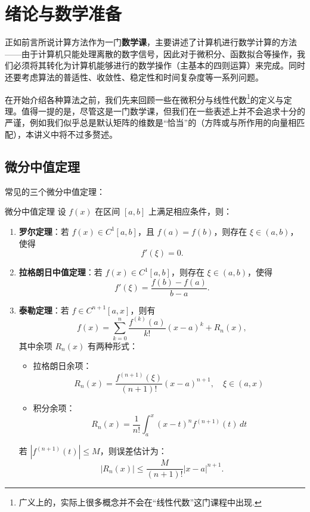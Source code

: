\chapter*{绪论与数学准备}

正如前言所说计算方法作为一门{\bf 数学课}，主要讲述了计算机进行数学计算的方法——由于计算机只能处理离散的数字信号，因此对于微积分、函数拟合等操作，我们必须将其转化为计算机能够进行的数学操作（主基本的四则运算）来完成。同时还要考虑算法的普适性、收敛性、稳定性和时间复杂度等一系列问题。

在开始介绍各种算法之前，我们先来回顾一些在微积分与线性代数\footnote{广义上的，实际上很多概念并不会在“线性代数”这门课程中出现.}的定义与定理。值得一提的是，尽管这是一门数学课，但我们在一些表述上并不会追求十分的严谨，例如我们似乎总是默认矩阵的维数是“恰当”的（方阵或与所作用的向量相匹配），本讲义中将不过多赘述。

\section{微分中值定理}
常见的三个微分中值定理：
\begin{theorem}{微分中值定理}
设 $f(x)$ 在区间 $[a,b]$ 上满足相应条件，则：
\begin{enumerate}
    \item \textbf{罗尔定理}：若 $f(x) \in C^1[a,b]$，且 $f(a) = f(b)$，则存在 $\xi \in (a,b)$，使得
    \[
        f'(\xi) = 0.
    \]

    \item \textbf{拉格朗日中值定理}：若 $f(x) \in C^1[a,b]$，则存在 $\xi \in (a,b)$，使得
    \[
        f'(\xi) = \frac{f(b) - f(a)}{b - a}.
    \]

    \item \textbf{泰勒定理}：若 $f \in C^{n+1}[a,x]$，则有
    \[
        f(x) = \sum_{k=0}^{n} \frac{f^{(k)}(a)}{k!}(x - a)^k + R_n(x),
    \]
    其中余项 $R_n(x)$ 有两种形式：

    \begin{itemize}
        \item 拉格朗日余项：
        \[
            R_n(x) = \frac{f^{(n+1)}(\xi)}{(n+1)!}(x - a)^{n+1}, \quad \xi \in (a,x)
        \]
        
        \item 积分余项：
        \[
            R_n(x) = \frac{1}{n!} \int_a^x (x - t)^n f^{(n+1)}(t) \, dt
        \]
    \end{itemize}

    若 $|f^{(n+1)}(t)| \leqslant M$，则误差估计为：
    \[
        |R_n(x)| \leqslant \frac{M}{(n+1)!} |x - a|^{n+1}.
    \]
\end{enumerate}
\end{theorem}


